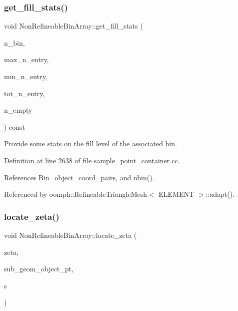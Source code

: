 \subsubsection{\texorpdfstring{get\+\_\+fill\+\_\+stats()}{get\_fill\_stats()}}
{\footnotesize\ttfamily void Non\+Refineable\+Bin\+Array\+::get\+\_\+fill\+\_\+stats (\begin{DoxyParamCaption}\item[{unsigned \&}]{n\+\_\+bin,  }\item[{unsigned \&}]{max\+\_\+n\+\_\+entry,  }\item[{unsigned \&}]{min\+\_\+n\+\_\+entry,  }\item[{unsigned \&}]{tot\+\_\+n\+\_\+entry,  }\item[{unsigned \&}]{n\+\_\+empty }\end{DoxyParamCaption}) const}



Provide some stats on the fill level of the associated bin. 



Definition at line 2638 of file sample\+\_\+point\+\_\+container.\+cc.



References Bin\+\_\+object\+\_\+coord\+\_\+pairs, and nbin().



Referenced by oomph\+::\+Refineable\+Triangle\+Mesh$<$ E\+L\+E\+M\+E\+N\+T $>$\+::adapt().

\mbox{\label{classNonRefineableBinArray_a27abcdeac898d37af63968ed97427e36}} 
\subsubsection{\texorpdfstring{locate\+\_\+zeta()}{locate\_zeta()}}
{\footnotesize\ttfamily void Non\+Refineable\+Bin\+Array\+::locate\+\_\+zeta (\begin{DoxyParamCaption}\item[{const Vector$<$ double $>$ \&}]{zeta,  }\item[{Geom\+Object $\ast$\&}]{sub\+\_\+geom\+\_\+object\+\_\+pt,  }\item[{Vector$<$ double $>$ \&}]{s }\end{DoxyParamCaption})\hspace{0.3cm}{\ttfamily [virtual]}}



